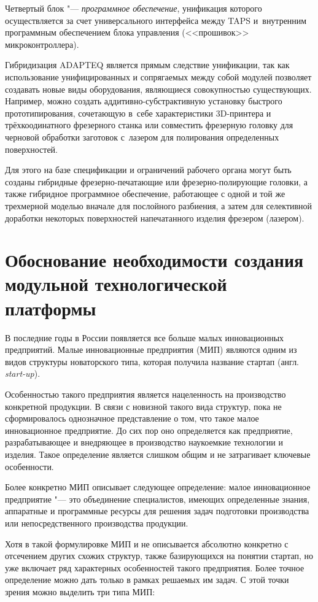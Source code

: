 Четвертый блок "--- \textit{программное обеспечение}, унификация которого осуществляется за счет универсального интерфейса между TAPS и~внутренним программным обеспечением блока управления (<<прошивок>> микроконтроллера).

Гибридизация ADAPTEQ является прямым следствие унификации, так как использование унифицированных и сопрягаемых между собой модулей позволяет создавать новые виды оборудования, являющиеся совокупностью существующих. Например, можно создать аддитивно-субстрактивную установку быстрого прототипирования, сочетающую в~себе характеристики 3D-принтера и трёхкоодинатного фрезерного станка или совместить фрезерную головку для черновой обработки заготовок с~лазером для полирования определенных поверхностей.

Для этого на базе спецификации и ограничений рабочего органа могут быть созданы гибридные фрезерно-печатающие или фрезерно-полирующие головки, а также гибридное программное обеспечение, работающее с одной и той же трехмерной моделью вначале для послойного разбиения, а затем для селективной доработки некоторых поверхностей напечатанного изделия фрезером (лазером).

\section{Обоснование необходимости создания модульной технологической платформы}

В последние годы в России появляется все больше малых инновационных предприятий. Малые инновационные предприятия (МИП) являются одним из видов структуры новаторского типа, которая получила название стартап (англ. \textit{start-up}).

Особенностью такого предприятия является нацеленность на производство конкретной продукции. В связи с новизной такого вида структур, пока не сформировалось однозначное представление о том, что такое малое инновационное предприятие. До сих пор оно определяется как предприятие, разрабатывающее и внедряющее в производство наукоемкие технологии и изделия. Такое определение является слишком общим и не затрагивает ключевые особенности.

Более конкретно МИП описывает следующее определение: малое инновационное предприятие "--- это объединение специалистов, имеющих определенные знания, аппаратные и программные ресурсы для решения задач подготовки производства или непосредственного производства продукции.

Хотя в такой формулировке МИП и не описывается абсолютно конкретно с отсечением других схожих структур, также базирующихся на понятии стартап, но уже включает ряд характерных особенностей такого предприятия. Более точное определение можно дать только в рамках решаемых им задач. С этой точки зрения можно выделить три типа МИП:

